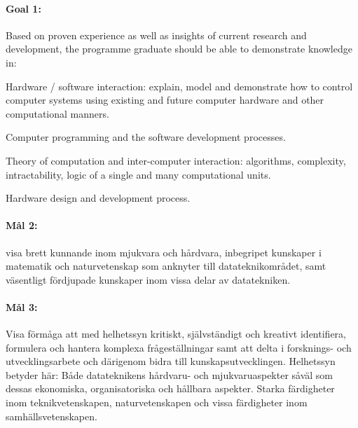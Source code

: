 
\paragraph{Goal 1:} Based on proven experience as well as insights of
current research and development, the programme graduate should be
able to demonstrate knowledge in:

Hardware / software interaction: explain, model and demonstrate how to
control computer systems using existing and future computer hardware
and other computational manners.

Computer programming and the software development processes.

Theory of computation and inter-computer interaction: algorithms,
complexity, intractability, logic of a single and many computational
units.

Hardware design and development process. 

\paragraph{Mål 2:} visa brett kunnande inom mjukvara och hårdvara,
inbegripet kunskaper i matematik och naturvetenskap som anknyter till
datateknikområdet, samt väsentligt fördjupade kunskaper inom vissa
delar av datatekniken.


\paragraph{Mål 3:} Visa förmåga att med helhetssyn kritiskt,
självständigt och kreativt identifiera, formulera och hantera komplexa
frågeställningar samt att delta i forsknings- och utvecklingsarbete
och därigenom bidra till kunskapsutvecklingen.
%
Helhetssyn betyder här: Både datateknikens hårdvaru- och
mjukvaruaspekter såväl som dessas ekonomiska, organisatoriska och
hållbara aspekter. Starka färdigheter inom teknikvetenskapen,
naturvetenskapen och vissa färdigheter inom samhällsvetenskapen.

